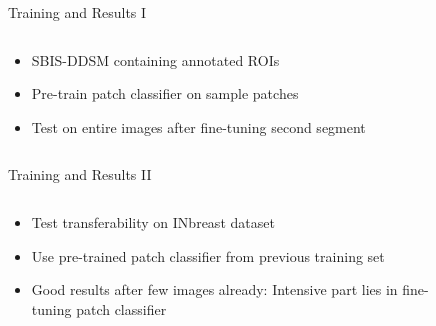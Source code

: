 \documentclass{beamer}
\begin{document}
\begin{frame}{Training and Results I}

\begin{columns}
	\begin{column}{0.5\textwidth}
		\begin{itemize}
			\item SBIS-DDSM containing annotated ROIs
			\item Pre-train patch classifier on sample patches
			\item<2-> Test on entire images after fine-tuning second segment
		\end{itemize}
	\end{column}
	\begin{column}{0.5\textwidth}
		\begin{figure}
			
			\centering
		\end{figure}
	\end{column}
\end{columns}


\end{frame}
\begin{frame}{Training and Results II}
	\begin{columns}
		\begin{column}{0.5\textwidth}
			\begin{itemize}
				\item Test transferability on INbreast dataset
				\item<2-> Use pre-trained patch classifier from previous training set
				\item<3-> Good results after few images already: Intensive part lies in fine-tuning patch classifier
			\end{itemize}
		\end{column}
		\begin{column}{0.5\textwidth}
			\begin{figure}
				
				\centering
			\end{figure}
		\end{column}
	\end{columns}
\end{frame}
\end{document}

